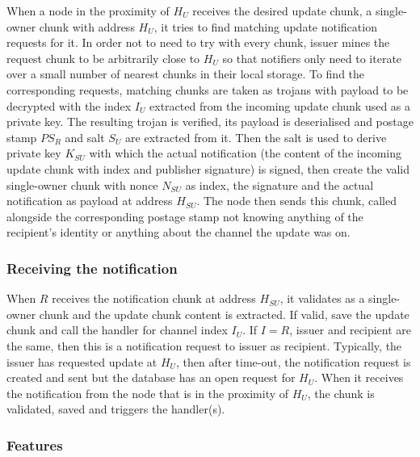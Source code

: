When a node in the proximity of $H_U$ receives the desired update chunk, a single-owner chunk with address $H_U$, it tries to find matching update notification requests for it. In order not to need to try with every chunk, issuer mines the request chunk to be arbitrarily close to $H_U$ so that notifiers only need to iterate over a small number of nearest chunks in their local storage. To find the corresponding requests, matching chunks are taken as trojans with payload to be decrypted with the index $I_U$ extracted from the incoming update chunk used as a private key. The resulting trojan is verified, its payload is deserialised and postage stamp $PS_R$ and salt $S_U$ are extracted from it. Then the salt is used to derive private key $K_{SU}$ with which the actual notification (the content of the incoming update chunk with index and publisher signature) is signed, then create the valid single-owner chunk with nonce $N_{SU}$ as index, the signature and the actual notification as payload at address $H_{SU}$. The node then sends this chunk, called  alongside the corresponding postage stamp not knowing anything of the recipient's identity or anything about the channel the update was on.


\subsubsection{Receiving the notification}

When $R$ receives the notification chunk at address $H_{SU}$, it validates as a single-owner chunk and the update chunk content is extracted. If valid, save the update chunk and call the handler for channel index $I_U$.
If $I=R$, issuer and recipient are the same, then this is a notification request to issuer as recipient.
Typically, the issuer has requested update at $H_U$, then after time-out, the notification request is created and sent but the database has an open request for $H_U$. When it receives the notification from the node that is in the proximity of $H_U$, the chunk is validated, saved and triggers the handler(s).


\subsubsection{Features}

